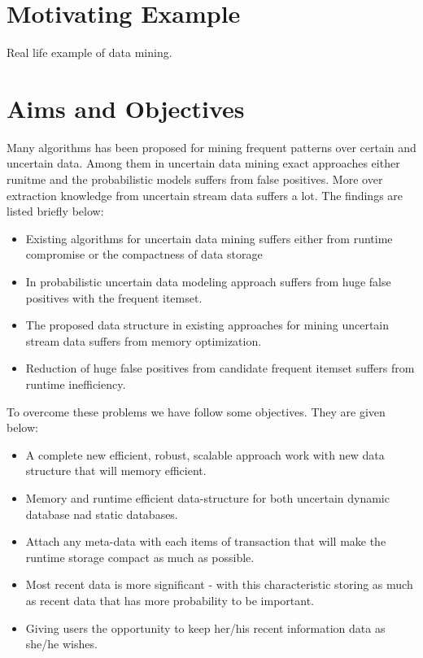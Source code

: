 \section{Motivating Example}
Real life example of data mining.


\section{Aims and Objectives}
Many algorithms has been proposed for mining frequent patterns over certain and uncertain data. Among them in uncertain data mining exact approaches either runitme and the probabilistic models suffers from false positives. More over extraction knowledge from uncertain stream data suffers a lot. The findings are listed briefly below:
\begin{itemize}
	\item Existing algorithms for uncertain data mining suffers either from runtime compromise or the compactness of data storage
	\item In probabilistic uncertain data modeling approach suffers from huge false positives with the frequent itemset.
	\item The proposed data structure in existing approaches for mining uncertain stream data suffers from memory optimization.
	\item Reduction of huge false positives from candidate frequent itemset suffers from runtime inefficiency.
\end{itemize}
To overcome these problems we have follow some objectives. They are given below:
\begin{itemize}
	\item A complete new efficient, robust, scalable approach work with new data structure that will memory efficient.
	\item Memory and runtime efficient data-structure for both uncertain dynamic database nad static databases.
	\item Attach any meta-data with each items of transaction that will make the runtime storage compact as much as possible.
	\item Most recent data is more significant - with this characteristic storing as much as recent data that has more probability to be important.
	\item Giving users the opportunity to keep her/his recent information data as she/he wishes.

\end{itemize}


